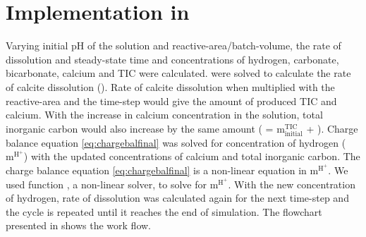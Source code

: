 \section{Implementation in \MATLAB}
Varying initial pH of the solution and reactive-area/batch-volume, the rate of dissolution and steady-state time and 
concentrations of hydrogen, carbonate, bicarbonate, calcium and TIC were calculated.  were solved 
to calculate the rate of calcite dissolution (). Rate of calcite dissolution when multiplied with the reactive-area 
and the time-step would give the amount of produced TIC and calcium. With the increase in calcium concentration in the 
solution, total inorganic carbon would also increase by the same amount ( = $\mathrm{m_{initial}^{TIC}}$ + ). 
Charge balance equation \ref{eq:chargebalfinal} was solved for concentration of hydrogen ($\mathrm{m^{H^{+}}}$) with the updated concentrations 
of calcium and total inorganic carbon. The charge balance equation \ref{eq:chargebalfinal} is a non-linear equation in $\mathrm{m^{H^+}}$. 
We used \MATLAB function , a non-linear solver, to solve  for $\mathrm{m^{H^+}}$. With the new 
concentration of hydrogen, rate of dissolution was calculated again for the next time-step and the cycle is repeated until it 
reaches the end of simulation. The flowchart presented in  shows the work flow. 


